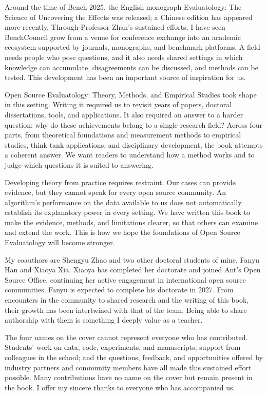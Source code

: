 Around the time of Bench 2025, the English monograph Evaluatology: The Science of Uncovering the Effects was released; a Chinese edition has appeared more recently. Through Professor Zhan's sustained efforts, I have seen BenchCouncil grow from a venue for conference exchange into an academic ecosystem supported by journals, monographs, and benchmark platforms. A field needs people who pose questions, and it also needs shared settings in which knowledge can accumulate, disagreements can be discussed, and methods can be tested. This development has been an important source of inspiration for us.

Open Source Evaluatology: Theory, Methods, and Empirical Studies took shape in this setting. Writing it required us to revisit years of papers, doctoral dissertations, tools, and applications. It also required an answer to a harder question: why do these achievements belong to a single research field? Across four parts, from theoretical foundations and measurement methods to empirical studies, think-tank applications, and disciplinary development, the book attempts a coherent answer. We want readers to understand how a method works and to judge which questions it is suited to answering.

Developing theory from practice requires restraint. Our cases can provide evidence, but they cannot speak for every open source community. An algorithm's performance on the data available to us does not automatically establish its explanatory power in every setting. We have written this book to make the evidence, methods, and limitations clearer, so that others can examine and extend the work. This is how we hope the foundations of Open Source Evaluatology will become stronger.

My coauthors are Shengyu Zhao and two other doctoral students of mine, Fanyu Han and Xiaoya Xia. Xiaoya has completed her doctorate and joined Ant's Open Source Office, continuing her active engagement in international open source communities. Fanyu is expected to complete his doctorate in 2027. From encounters in the community to shared research and the writing of this book, their growth has been intertwined with that of the team. Being able to share authorship with them is something I deeply value as a teacher.

The four names on the cover cannot represent everyone who has contributed. Students' work on data, code, experiments, and manuscripts; support from colleagues in the school; and the questions, feedback, and opportunities offered by industry partners and community members have all made this sustained effort possible. Many contributions have no name on the cover but remain present in the book. I offer my sincere thanks to everyone who has accompanied us.

